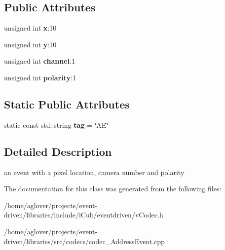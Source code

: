 \subsection*{Public Attributes}
\begin{DoxyCompactItemize}
\item 
unsigned int {\bfseries x}\+:10\hypertarget{classev_1_1AddressEvent_ab6015dc7a789cb6ff7546c47d58829bf}{}\label{classev_1_1AddressEvent_ab6015dc7a789cb6ff7546c47d58829bf}

\item 
unsigned int {\bfseries y}\+:10\hypertarget{classev_1_1AddressEvent_a2e6918d9a0c935c2424e8096ed610c6f}{}\label{classev_1_1AddressEvent_a2e6918d9a0c935c2424e8096ed610c6f}

\item 
unsigned int {\bfseries channel}\+:1\hypertarget{classev_1_1AddressEvent_ab96b9ac3a42cf1d69859f1edbea9cc7f}{}\label{classev_1_1AddressEvent_ab96b9ac3a42cf1d69859f1edbea9cc7f}

\item 
unsigned int {\bfseries polarity}\+:1\hypertarget{classev_1_1AddressEvent_a79bbcea834183012aa39e9d4b2c594ed}{}\label{classev_1_1AddressEvent_a79bbcea834183012aa39e9d4b2c594ed}

\end{DoxyCompactItemize}
\subsection*{Static Public Attributes}
\begin{DoxyCompactItemize}
\item 
static const std\+::string {\bfseries tag} = \char`\"{}AE\char`\"{}\hypertarget{classev_1_1AddressEvent_a9a2d3e863964a1247ae4203a4ad2c646}{}\label{classev_1_1AddressEvent_a9a2d3e863964a1247ae4203a4ad2c646}

\end{DoxyCompactItemize}


\subsection{Detailed Description}
an event with a pixel location, camera number and polarity 

The documentation for this class was generated from the following files\+:\begin{DoxyCompactItemize}
\item 
/home/aglover/projects/event-\/driven/libraries/include/i\+Cub/eventdriven/v\+Codec.\+h\item 
/home/aglover/projects/event-\/driven/libraries/src/codecs/codec\+\_\+\+Address\+Event.\+cpp\end{DoxyCompactItemize}

